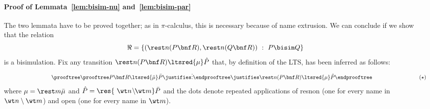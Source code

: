 \documentclass{LMCS}
\begin{document}
\paragraph{Proof of Lemmata~\ref{lem:bisim-nu} and~\ref{lem:bisim-par}}
The two lemmata have to be proved together; as in $\pi$-calculus, this is necessary because of name extrusion.
We can conclude if we show that the relation
$$
\Re = \{(\rest n (P\bnf R),\rest n (Q\bnf R))\ :\ P \bisim Q\}
$$
is a bisimulation.
Fix any transition $\rest n (P\bnf R) \ltsred{\mu} \hat P$ that,
by definition of the LTS, has been inferred as follows:
$$
\hspace*{3cm}
\prooftree 
	\prooftree P\bnf R \ltsred{\bar\mu} \bar P
	\justifies \vdots
	\endprooftree
\justifies \rest n (P\bnf R) \ltsred{\mu} \hat P
\endprooftree
\hspace*{3cm}
(\star)
$$
where $\mu = \rest m \bar\mu$ and $\hat P = \res{\ \wt n\! \setminus\!\! \wt m} \bar P$ and
the dots denote repeated applications of {\sf resnon} (one for every name in $\wt n \setminus \wt m$) 
and {\sf open} (one for every name in $\wt m$).
\end{document}
